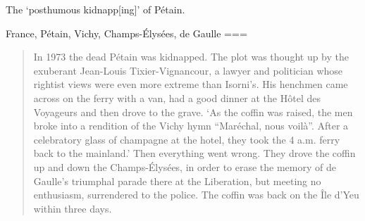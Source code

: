 The ‘posthumous kidnapp[ing]’ of Pétain.

France, Pétain, Vichy, Champs-Élysées, de Gaulle
===
\begin{quote}
    In 1973 the dead Pétain was kidnapped. The plot was thought up by the exuberant Jean-Louis Tixier-Vignancour, a lawyer and politician whose rightist views were even more extreme than Isorni’s. His henchmen came across on the ferry with a van, had a good dinner at the Hôtel des Voyageurs and then drove to the grave. ‘As the coffin was raised, the men broke into a rendition of the Vichy hymn “Maréchal, nous voilà”. After a celebratory glass of champagne at the hotel, they took the 4 a.m. ferry back to the mainland.’ Then everything went wrong. They drove the coffin up and down the Champs-Élysées, in order to erase the memory of de Gaulle’s triumphal parade there at the Liberation, but meeting no enthusiasm, surrendered to the police. The coffin was back on the Île d’Yeu within three days.
\end{quote}

\nocite{ascherson2024}
